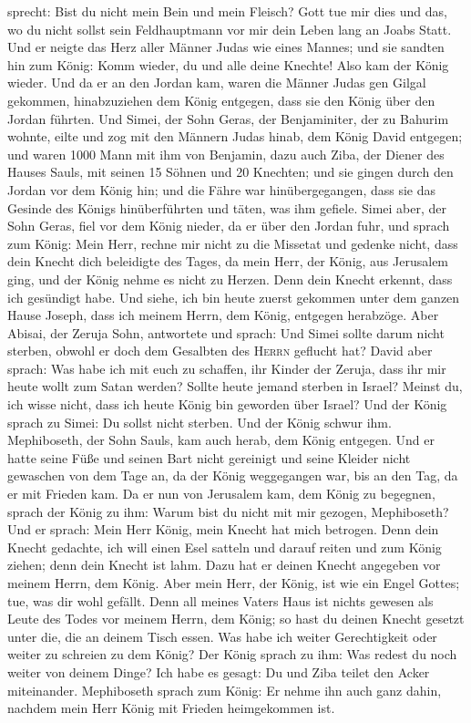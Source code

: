 sprecht: Bist du nicht mein Bein und mein Fleisch? Gott tue mir dies und
das, wo du nicht sollst sein Feldhauptmann vor mir dein Leben lang an
Joabs Statt.  Und er neigte das Herz aller Männer Judas
wie eines Mannes; und sie sandten hin zum König: Komm wieder, du und
alle deine Knechte!  Also kam der König wieder. Und da er
an den Jordan kam, waren die Männer Judas gen Gilgal gekommen,
hinabzuziehen dem König entgegen, dass sie den König über den Jordan
führten.  Und Simei, der Sohn Geras, der Benjaminiter,
der zu Bahurim wohnte, eilte und zog mit den Männern Judas hinab, dem
König David entgegen;  und waren 1000 Mann mit ihm von
Benjamin, dazu auch Ziba, der Diener des Hauses Sauls, mit seinen 15
Söhnen und 20 Knechten; und sie gingen durch den Jordan vor dem König
hin;  und die Fähre war hinübergegangen, dass sie das
Gesinde des Königs hinüberführten und täten, was ihm gefiele. Simei
aber, der Sohn Geras, fiel vor dem König nieder, da er über den Jordan
fuhr,  und sprach zum König: Mein Herr, rechne mir nicht
zu die Missetat und gedenke nicht, dass dein Knecht dich beleidigte des
Tages, da mein Herr, der König, aus Jerusalem ging, und der König nehme
es nicht zu Herzen.  Denn dein Knecht erkennt, dass ich
gesündigt habe. Und siehe, ich bin heute zuerst gekommen unter dem
ganzen Hause Joseph, dass ich meinem Herrn, dem König, entgegen
herabzöge.  Aber Abisai, der Zeruja Sohn, antwortete und
sprach: Und Simei sollte darum nicht sterben, obwohl er doch dem
Gesalbten des \textsc{Herrn} geflucht hat?  David aber
sprach: Was habe ich mit euch zu schaffen, ihr Kinder der Zeruja, dass
ihr mir heute wollt zum Satan werden? Sollte heute jemand sterben in
Israel? Meinst du, ich wisse nicht, dass ich heute König bin geworden
über Israel?  Und der König sprach zu Simei: Du sollst
nicht sterben. Und der König schwur ihm.  Mephiboseth,
der Sohn Sauls, kam auch herab, dem König entgegen. Und er hatte seine
Füße und seinen Bart nicht gereinigt und seine Kleider nicht gewaschen
von dem Tage an, da der König weggegangen war, bis an den Tag, da er mit
Frieden kam.  Da er nun von Jerusalem kam, dem König zu
begegnen, sprach der König zu ihm: Warum bist du nicht mit mir gezogen,
Mephiboseth?  Und er sprach: Mein Herr König, mein Knecht
hat mich betrogen. Denn dein Knecht gedachte, ich will einen Esel
satteln und darauf reiten und zum König ziehen; denn dein Knecht ist
lahm.  Dazu hat er deinen Knecht angegeben vor meinem
Herrn, dem König. Aber mein Herr, der König, ist wie ein Engel Gottes;
tue, was dir wohl gefällt.  Denn all meines Vaters Haus
ist nichts gewesen als Leute des Todes vor meinem Herrn, dem König; so
hast du deinen Knecht gesetzt unter die, die an deinem Tisch essen. Was
habe ich weiter Gerechtigkeit oder weiter zu schreien zu dem König?
 Der König sprach zu ihm: Was redest du noch weiter von
deinem Dinge? Ich habe es gesagt: Du und Ziba teilet den Acker
miteinander.  Mephiboseth sprach zum König: Er nehme ihn
auch ganz dahin, nachdem mein Herr König mit Frieden heimgekommen ist.

